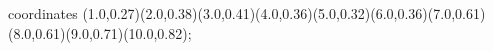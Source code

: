 					coordinates { (1.0,0.27)(2.0,0.38)(3.0,0.41)(4.0,0.36)(5.0,0.32)(6.0,0.36)(7.0,0.61)(8.0,0.61)(9.0,0.71)(10.0,0.82)};